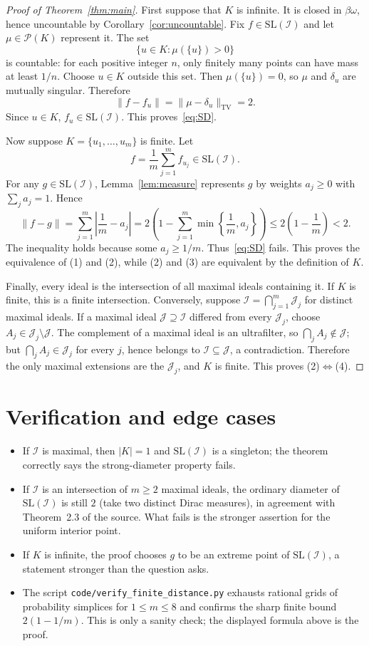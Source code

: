 \documentclass[11pt]{article}
\theoremstyle{definition}
\theoremstyle{remark}
\newcommand{\I}{\mathcal I}
\newcommand{\SL}{\mathrm{SL}}
\newcommand{\bN}{\beta\omega}
\begin{document}
\begin{proof}[Proof of Theorem~\ref{thm:main}]
First suppose that $K$ is infinite.  It is closed in $\bN$, hence uncountable
by Corollary~\ref{cor:uncountable}.  Fix $f\in\SL(\I)$ and let
$\mu\in\mathcal P(K)$ represent it.  The set
\[
  \{u\in K:\mu(\{u\})>0\}
\]
is countable: for each positive integer $n$, only finitely many points can
have mass at least $1/n$.  Choose $u\in K$ outside this set.  Then
$\mu(\{u\})=0$, so $\mu$ and $\delta_u$ are mutually singular.  Therefore
\[
  \|f-f_u\|=\|\mu-\delta_u\|_{\mathrm{TV}}=2.
\]
Since $u\in K$, $f_u\in\SL(\I)$.  This proves~\eqref{eq:SD}.

Now suppose $K=\{u_1,\ldots,u_m\}$ is finite.  Let
\[
  f=\frac1m\sum_{j=1}^m f_{u_j}\in\SL(\I).
\]
For any $g\in\SL(\I)$, Lemma~\ref{lem:measure} represents $g$ by weights
$a_j\ge0$ with $\sum_j a_j=1$.  Hence
\[
  \|f-g\|=\sum_{j=1}^m\left|\frac1m-a_j\right|
  =2\left(1-\sum_{j=1}^m\min\left\{\frac1m,a_j\right\}\right)
  \le 2\left(1-\frac1m\right)<2.
\]
The inequality holds because some $a_j\ge1/m$.  Thus~\eqref{eq:SD} fails.
This proves the equivalence of (1) and (2), while (2) and (3) are equivalent
by the definition of $K$.

Finally, every ideal is the intersection of all maximal ideals containing it.
If $K$ is finite, this is a finite intersection.  Conversely, suppose
$\I=\bigcap_{j=1}^m\mathcal J_j$ for distinct maximal ideals.  If a maximal
ideal $\mathcal J\supseteq\I$ differed from every $\mathcal J_j$, choose
$A_j\in\mathcal J_j\setminus\mathcal J$.  The complement of a maximal ideal
is an ultrafilter, so $\bigcap_j A_j\notin\mathcal J$; but
$\bigcap_j A_j\in\mathcal J_j$ for every $j$, hence belongs to $\I\subseteq
\mathcal J$, a contradiction.  Therefore the only maximal extensions are the
$\mathcal J_j$, and $K$ is finite.  This proves (2)$\Leftrightarrow$(4).
\end{proof}

\section{Verification and edge cases}

\begin{itemize}
  \item If $\I$ is maximal, then $|K|=1$ and $\SL(\I)$ is a singleton; the
  theorem correctly says the strong-diameter property fails.
  \item If $\I$ is an intersection of $m\ge2$ maximal ideals, the ordinary
  diameter of $\SL(\I)$ is still $2$ (take two distinct Dirac measures), in
  agreement with Theorem~2.3 of the source.  What fails is the stronger
  assertion for the uniform interior point.
  \item If $K$ is infinite, the proof chooses $g$ to be an extreme point of
  $\SL(\I)$, a statement stronger than the question asks.
  \item The script \texttt{code/verify\_finite\_distance.py} exhausts rational
  grids of probability simplices for $1\le m\le8$ and confirms the sharp
  finite bound $2(1-1/m)$.  This is only a sanity check; the displayed formula
  above is the proof.
\end{itemize}
\end{document}
